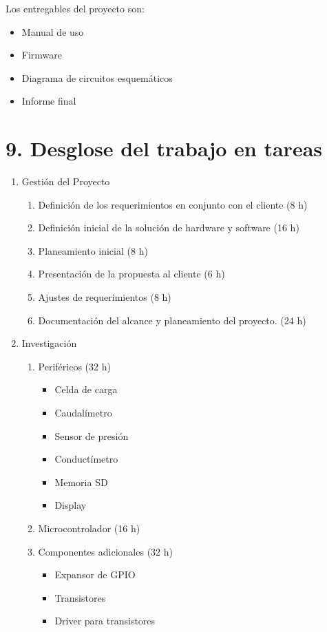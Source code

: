 \documentclass[
11pt, %
]{charter}
\begin{document}
Los entregables del proyecto son:

\begin{itemize}
	\item Manual de uso
	\item Firmware
	\item Diagrama de circuitos esquemáticos
	\item Informe final
\end{itemize}

\section{9. Desglose del trabajo en tareas}
\label{sec:wbs}

\begin{enumerate}
\item Gestión del Proyecto 
	\begin{enumerate}	
	\item Definición de los requerimientos en conjunto con el cliente (8 h)
	\item Definición inicial de la solución de hardware y software (16 h)
	\item Planeamiento inicial (8 h)
	\item Presentación de la propuesta al cliente (6 h)
	\item Ajustes de requerimientos (8 h)
	\item Documentación del alcance y planeamiento del proyecto. (24 h)
	\end{enumerate}
\item Investigación
	\begin{enumerate}
	\item Periféricos (32 h)
		\begin{itemize}
			\item Celda de carga
			\item Caudalímetro
			\item Sensor de presión
			\item Conductímetro
			\item Memoria SD
			\item Display
		\end{itemize}
	\item Microcontrolador (16 h)
	\item Componentes adicionales (32 h)
		\begin{itemize}
			\item Expansor de GPIO
			\item Transistores
			\item Driver para transistores

\end{itemize}
\end{enumerate}
\end{enumerate}
\end{document}
